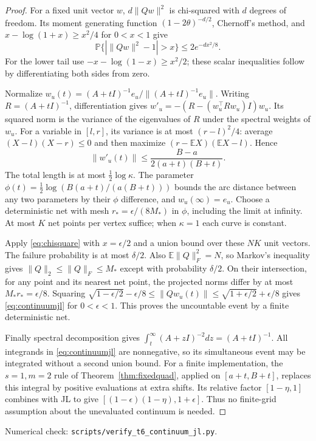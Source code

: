 \documentclass[11pt]{article}
\newcommand{\E}{\mathbb E}
\newcommand{\Prob}{\mathbb P}
\begin{document}
\begin{proof}
For a fixed unit vector $w$, $d\|Qw\|^2$ is chi-squared with $d$
degrees of freedom. Its moment generating function
$(1-2\theta)^{-d/2}$, Chernoff's method, and
$x-\log(1+x)\geq x^2/4$ for $0<x<1$ give
\begin{equation}\label{eq:chisquare}
 \Prob\{|\|Qw\|^2-1|>x\}\leq2e^{-dx^2/8}.
\end{equation}
For the lower tail use $-x-\log(1-x)\geq x^2/2$; these scalar
inequalities follow by differentiating both sides from zero.

Normalize $w_u(t)=(A+tI)^{-1}e_u/\|(A+tI)^{-1}e_u\|$.
Writing $R=(A+tI)^{-1}$, differentiation gives
$w'_u=-(R-(w_u^\top Rw_u)I)w_u$. Its squared norm is the variance
of the eigenvalues of $R$ under the spectral weights of $w_u$.
For a variable in $[l,r]$, its variance is at most $(r-l)^2/4$:
average $(X-l)(X-r)\leq0$ and then maximize
$(r-\E X)(\E X-l)$. Hence
\[
 \|w'_u(t)\|\leq\frac{B-a}{2(a+t)(B+t)}.
\]
The total length is at most $\tfrac12\log\kappa$.
The parameter
$\phi(t)=\tfrac12\log(B(a+t)/(a(B+t)))$ bounds the arc distance
between any two parameters by their $\phi$ difference, and
$w_u(\infty)=e_u$. Choose a deterministic net with mesh
$r_* =\epsilon/(8M_*)$ in $\phi$, including the limit at infinity.
At most $K$ net points per vertex suffice; when $\kappa=1$ each
curve is constant.

Apply \eqref{eq:chisquare} with $x=\epsilon/2$ and a union bound
over these $NK$ unit vectors. The failure probability is at most
$\delta/2$. Also $\E\|Q\|_F^2=N$, so Markov's inequality gives
$\|Q\|_2\leq\|Q\|_F\leq M_*$ except with probability $\delta/2$.
On their intersection, for any point and its nearest net point,
the projected norms differ by at most $M_*r_* =\epsilon/8$.
Squaring
$\sqrt{1-\epsilon/2}-\epsilon/8\leq\|Qw_u(t)\|
\leq\sqrt{1+\epsilon/2}+\epsilon/8$
gives \eqref{eq:continuumjl} for $0<\epsilon<1$.
This proves the uncountable event by a finite deterministic net.

Finally spectral decomposition gives
$\int_t^\infty (A+zI)^{-2}dz=(A+tI)^{-1}$.
All integrands in \eqref{eq:continuumjl} are nonnegative, so its
simultaneous event may be integrated without a second union bound.
For a finite implementation, the $s=1,m=2$ rule of
Theorem~\ref{thm:fixedquad}, applied on $[a+t,B+t]$, replaces this
integral by positive evaluations at extra shifts. Its relative
factor $[1-\eta,1]$ combines with JL to give
$[(1-\epsilon)(1-\eta),1+\epsilon]$. Thus no finite-grid assumption
about the unevaluated continuum is needed.
\end{proof}
\noindent Numerical check: \texttt{scripts/verify\_t6\_continuum\_jl.py}.
\end{document}
